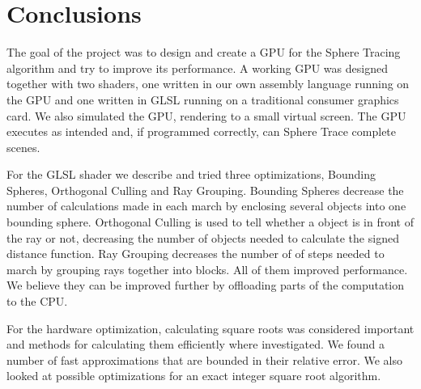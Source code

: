 \chapter{Conclusions}

	The goal of the project was to design and create a GPU for the Sphere Tracing
	algorithm and try to improve its performance. A working GPU was designed
	together with two shaders, one written in our own assembly language running
	on the GPU and one written in GLSL running on a traditional consumer graphics
	card. We also simulated the GPU, rendering to a small virtual screen. The GPU
	executes as intended and, if programmed correctly, can Sphere Trace complete
	scenes.
	
	For the GLSL shader we describe and tried three optimizations, Bounding
	Spheres, Orthogonal Culling and Ray Grouping. Bounding Spheres decrease the
	number of calculations made in each march by enclosing several objects into
	one bounding sphere. Orthogonal Culling is used to tell whether a object is
	in front of the ray or not, decreasing the number of objects needed to
	calculate the signed distance function. Ray Grouping decreases the number of
	of steps needed to march by grouping rays together into blocks. All of them
	improved performance. We believe they can be improved further by offloading
	parts of the computation to the CPU.
	
	For the hardware optimization, calculating square roots was considered
	important and methods for calculating them efficiently where investigated. We
	found a number of fast approximations that are bounded in their relative
	error. We also looked at possible optimizations for an exact integer square
	root algorithm.
